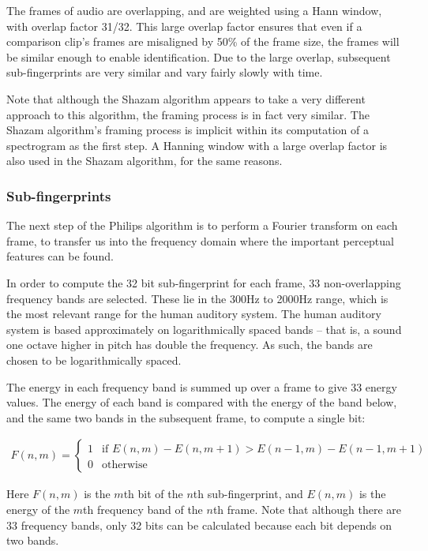 \documentclass[12pt,a4paper,twoside,openright]{report}
\begin{document}
The frames of audio are overlapping, and are weighted using a Hann window, with overlap factor 31/32. This large overlap factor ensures that even if a comparison clip's frames are misaligned by 50\% of the frame size, the frames will be similar enough to enable identification. Due to the large overlap, subsequent sub-fingerprints are very similar and vary fairly slowly with time. 

Note that although the Shazam algorithm appears to take a very different approach to this algorithm, the framing process is in fact very similar. The Shazam algorithm's framing process is implicit within its computation of a spectrogram as the first step. A Hanning window with a large overlap factor is also used in the Shazam algorithm, for the same reasons.

\subsubsection{Sub-fingerprints}

The next step of the Philips algorithm is to perform a Fourier transform on each frame, to transfer us into the frequency domain where the important perceptual features can be found.

In order to compute the 32 bit sub-fingerprint for each frame, 33 non-overlapping frequency bands are selected. These lie in the 300Hz to 2000Hz range, which is the most relevant range for the human auditory system. The human auditory system is based approximately on logarithmically spaced bands -- that is, a sound one octave higher in pitch has double the frequency. As such, the bands are chosen to be logarithmically spaced.

The energy in each frequency band is summed up over a frame to give 33 energy values. The energy of each band is compared with the energy of the band below, and the same two bands in the subsequent frame, to compute a single bit:

\begin{align*}
  F(n,m)=
  \begin{cases}
      1 & \text{if } E(n,m)-E(n,m+1) > E(n-1,m)-E(n-1,m+1)\\
      0 & \text{otherwise}
  \end{cases}
\end{align*}

Here $F(n,m)$ is the $m$th bit of the $n$th sub-fingerprint, and $E(n,m)$ is the energy of the $m$th frequency band of the $n$th frame. Note that although there are 33 frequency bands, only 32 bits can be calculated because each bit depends on two bands.
\end{document}

